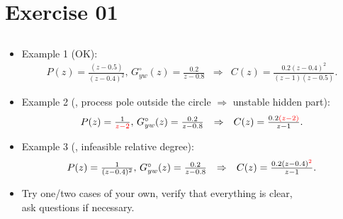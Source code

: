 \section{Exercise 01}
\subsection{}

\begin{frame}
\myPause
 \begin{itemize}[<+-| alert@+>]
 \item Example 1 (OK):
       \begin{displaymath}
        \begin{array}{lcl}
         P(z)              = \frac{(z-0.5)}{(z-0.4)^2},\,
         G_{yw}^{\circ}(z) = \frac{0.2}{z-0.8} &
         \Rightarrow &
         C(z)              = \frac{0.2(z-0.4)^2}{(z-1)(z-0.5)}.
        \end{array}
       \end{displaymath}
 \item Example 2 (, process pole outside the circle $\Rightarrow$ unstable hidden part):
       \begin{displaymath}
        \begin{array}{lcl}
         P(z)              = \frac{1}{\textcolor{red}{z-2}},\,
         G_{yw}^{\circ}(z) = \frac{0.2}{z-0.8} &
         \Rightarrow &
         C(z)              = \frac{0.2\textcolor{red}{(z-2)}}{z-1}.
        \end{array}
       \end{displaymath}
 \item Example 3 (, infeasible relative degree):
       \begin{displaymath}
        \begin{array}{lcl}
         P(z)              = \frac{1}{(z-0.4)^2},\,
         G_{yw}^{\circ}(z) = \frac{0.2}{z-0.8} &
         \Rightarrow &
         C(z)              = \frac{0.2(z-0.4)^{\textcolor{red}{2}}}{z-1}.
        \end{array}
       \end{displaymath}
 \item Try one/two cases of your own, verify that everything is clear,\\
       ask questions if necessary.
 \end{itemize}
\end{frame}

